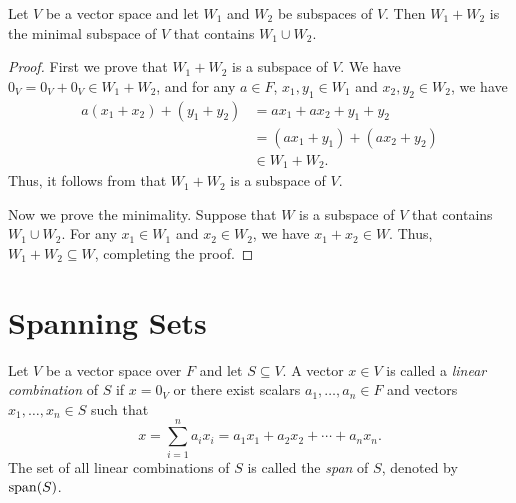 \begin{theorem}
  \label{thm:subspace-sum}
  Let $V$ be a vector space and let $W_1$ and $W_2$ be subspaces of $V$.
  Then $W_1 + W_2$ is the minimal subspace of $V$ that contains $W_1 \cup W_2$.
\end{theorem}
\begin{proof}
  First we prove that $W_1 + W_2$ is a subspace of $V$.
  We have $0_V = 0_V + 0_V \in W_1 + W_2$, and for any $a \in F$,
  $x_1, y_1 \in W_1$ and $x_2, y_2 \in W_2$, we have
  \begin{align*}
    a(x_1 + x_2) + (y_1 + y_2)
    &= ax_1 + ax_2 + y_1 + y_2 \\
    &= (ax_1 + y_1) + (ax_2 + y_2) \\
    &\in W_1 + W_2.
  \end{align*}
  Thus, it follows from  that $W_1 + W_2$ is a subspace of
  $V$.

  Now we prove the minimality.
  Suppose that $W$ is a subspace of $V$ that contains $W_1 \cup W_2$.
  For any $x_1 \in W_1$ and $x_2 \in W_2$, we have $x_1 + x_2 \in W$.
  Thus, $W_1 + W_2 \subseteq W$, completing the proof.
\end{proof}

\section{Spanning Sets}
\begin{definition}
  \label{def:linear-combination}
  Let $V$ be a vector space over $F$ and let $S \subseteq V$.
  A vector $x \in V$ is called a \emph{linear combination} of $S$ if $x = 0_V$
  or there exist scalars $a_1, \dots, a_n \in F$ and vectors
  $x_1, \dots, x_n \in S$ such that
  \begin{equation*}
    x = \sum_{i=1}^n a_ix_i = a_1x_1 + a_2x_2 + \cdots + a_nx_n.
  \end{equation*}
  The set of all linear combinations of $S$ is called the \emph{span} of $S$,
  denoted by $\operatorname{span}(S)$.
\end{definition}


